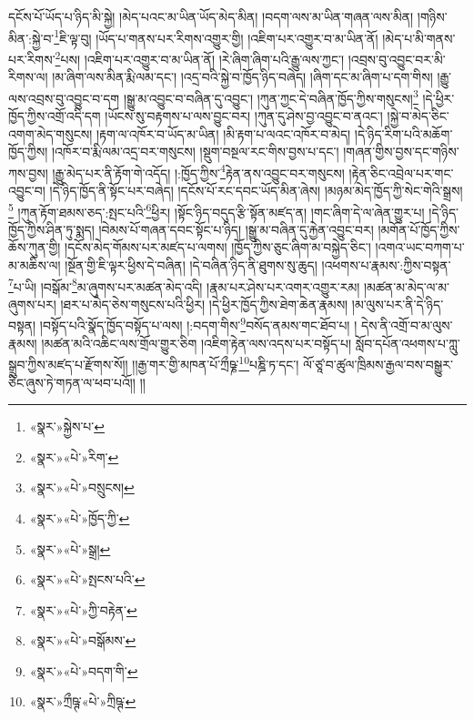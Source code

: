 དངོས་པོ་ཡོད་པ་ཉིད་མི་སྐྱེ། །མེད་པའང་མ་ཡིན་ཡོད་མེད་མིན། །བདག་ལས་མ་ཡིན་གཞན་ལས་མིན། །གཉིས་མིན་:སྐྱེ་བ་\footnote{«སྣར་»སྐྱེས་པ་}ཇི་ལྟ་བུ། །ཡོད་པ་གནས་པར་རིགས་འགྱུར་གྱི། །འཇིག་པར་འགྱུར་བ་མ་ཡིན་ནོ། །མེད་པ་མི་གནས་པར་རིགས་\footnote{«སྣར་»«པེ་»རིག་}པས། །འཇིག་པར་འགྱུར་བ་མ་ཡིན་ནོ། །རེ་ཞིག་ཞིག་པའི་རྒྱུ་ལས་ཀྱང་། །འབྲས་བུ་འབྱུང་བར་མི་རིགས་ལ། །མ་ཞིག་ལས་མིན་རྨི་ལམ་དང་། །འདྲ་བའི་སྐྱེ་བ་ཁྱོད་ཉིད་བཞེད། །ཞིག་དང་མ་ཞིག་པ་དག་གིས། །རྒྱུ་ལས་འབྲས་བུ་འབྱུང་བ་དག །སྒྱུ་མ་འབྱུང་བ་བཞིན་དུ་འབྱུང་། །ཀུན་ཀྱང་དེ་བཞིན་ཁྱོད་ཀྱིས་གསུངས།\footnote{«སྣར་»«པེ་»བསྲུངས།} །དེ་ཕྱིར་ཁྱོད་ཀྱིས་འགྲོ་འདི་དག །ཡོངས་སུ་བརྟགས་པ་ལས་བྱུང་བར། །ཀུན་དུ་ཤེས་བྱ་འབྱུང་བ་ནའང་། །སྐྱེ་བ་མེད་ཅིང་འགག་མེད་གསུངས། །རྟག་ལ་འཁོར་བ་ཡོད་མ་ཡིན། །མི་རྟག་པ་ལའང་འཁོར་བ་མེད། །དེ་ཉིད་རིག་པའི་མཆོག་ཁྱོད་ཀྱིས། །འཁོར་བ་རྨི་ལམ་འདྲ་བར་གསུངས། །སྡུག་བསྔལ་རང་གིས་བྱས་པ་དང་། །གཞན་གྱིས་བྱས་དང་གཉིས་ཀས་བྱས། །རྒྱུ་མེད་པར་ནི་རྟོག་གེ་འདོད། །:ཁྱོད་ཀྱིས་\footnote{«སྣར་»«པེ་»ཁྱོད་ཀྱི་}རྟེན་ནས་འབྱུང་བར་གསུངས། །རྟེན་ཅིང་འབྲེལ་པར་གང་འབྱུང་བ། །དེ་ཉིད་ཁྱོད་ནི་སྟོང་པར་བཞེད། །དངོས་པོ་རང་དབང་ཡོད་མིན་ཞེས། །མཉམ་མེད་ཁྱོད་ཀྱི་སེང་གེའི་སྒྲས།\footnote{«སྣར་»«པེ་»སྒྲ།} །ཀུན་རྟོག་ཐམས་ཅད་:སྤང་པའི་\footnote{«སྣར་»«པེ་»སྤངས་པའི་}ཕྱིར། །སྟོང་ཉིད་བདུད་རྩི་སྟོན་མཛད་ན། །གང་ཞིག་དེ་ལ་ཞེན་གྱུར་པ། །དེ་ཉིད་ཁྱོད་ཀྱིས་ཤིན་ཏུ་སྨད། །བེམས་པོ་གཞན་དབང་སྟོང་པ་ཉིད། །སྒྱུ་མ་བཞིན་དུ་རྐྱེན་འབྱུང་བར། །མགོན་པོ་ཁྱོད་ཀྱིས་ཆོས་ཀུན་གྱི། །དངོས་མེད་གོམས་པར་མཛད་པ་ལགས། །ཁྱོད་ཀྱིས་ཅུང་ཞིག་མ་བསྐྱེད་ཅིང་། །འགའ་ཡང་བཀག་པ་མ་མཆིས་ལ། །སྔོན་གྱི་ཇི་ལྟར་ཕྱིས་དེ་བཞིན། །དེ་བཞིན་ཉིད་ནི་ཐུགས་སུ་ཆུད། །འཕགས་པ་རྣམས་:ཀྱིས་བསྟན་\footnote{«སྣར་»«པེ་»ཀྱི་བརྟེན་}པ་ཡི། །བསྒོམ་\footnote{«སྣར་»«པེ་»བསྒོམས་}མ་ཞུགས་པར་མཚན་མེད་འདི། །རྣམ་པར་ཤེས་པར་འགར་འགྱུར་རམ། །མཚན་མ་མེད་ལ་མ་ཞུགས་པར། །ཐར་པ་མེད་ཅེས་གསུངས་པའི་ཕྱིར། །དེ་ཕྱིར་ཁྱོད་ཀྱིས་ཐེག་ཆེན་རྣམས། །མ་ལུས་པར་ནི་དེ་ཉིད་བསྟན། །བསྟོད་པའི་སྣོད་ཁྱོད་བསྟོད་པ་ལས། །:བདག་གིས་\footnote{«སྣར་»«པེ་»བདག་གི་}བསོད་ནམས་གང་ཐོབ་པ། །
དེས་ནི་འགྲོ་བ་མ་ལུས་རྣམས། །མཚན་མའི་འཆིང་ལས་གྲོལ་གྱུར་ཅིག །འཇིག་རྟེན་ལས་འདས་པར་བསྟོད་པ། སློབ་དཔོན་འཕགས་པ་ཀླུ་སྒྲུབ་ཀྱིས་མཛད་པ་རྫོགས་སོ།། །།རྒྱ་གར་གྱི་མཁན་པོ་ཀྲྀཥྞ་\footnote{«སྣར་»ཀྲྀཥྚ་«པེ་»ཀྲིཥྚ་}པཎྜི་ཏ་དང་། ལོ་ཙཱ་བ་ཚུལ་ཁྲིམས་རྒྱལ་བས་བསྒྱུར་ཅིང་ཞུས་ཏེ་གཏན་ལ་ཕབ་པའོ།། །།